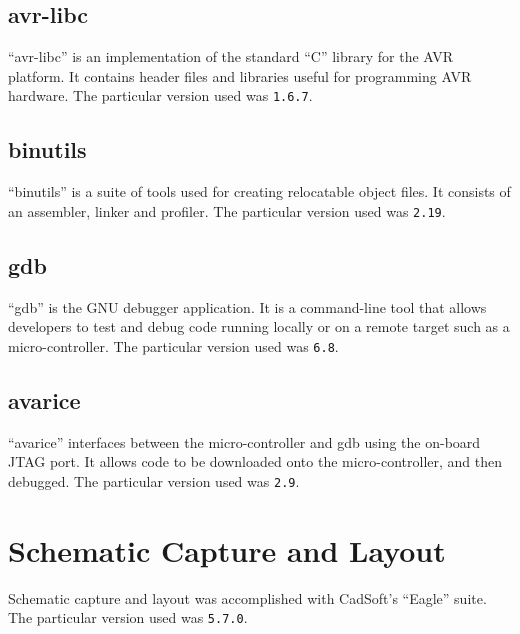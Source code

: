 \subsection*{avr-libc}

{}``avr-libc'' is an implementation of the standard ``C'' library for the AVR platform. It contains header files and libraries useful for programming AVR hardware. The particular version used was \texttt{1.6.7}.

\subsection*{binutils}

{}``binutils'' is a suite of tools used for creating relocatable object files. It consists of an assembler, linker and profiler. The particular version used was \texttt{2.19}.

\subsection*{gdb}

{}``gdb'' is the GNU debugger application. It is a command-line tool that allows developers to test and debug code running locally or on a remote target such as a micro-controller. The particular version used was \texttt{6.8}.

\subsection*{avarice}

{}``avarice'' interfaces between the micro-controller and gdb using the on-board JTAG port. It allows code to be downloaded onto the micro-controller, and then debugged. The particular version used was \texttt{2.9}.

\section*{Schematic Capture and Layout}

Schematic capture and layout was accomplished with CadSoft's ``Eagle'' suite. The particular version used was \texttt{5.7.0}. 


